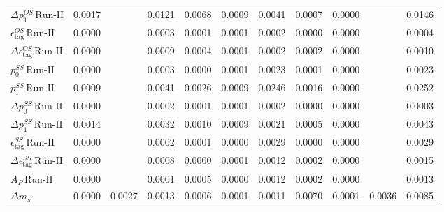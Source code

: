 \begin{tabular}{l  c  c  c  c  c  c  c  c  c  | c }
$\Delta p_{1}^{OS} \, \text{Run-II}$ & 0.0017 &  & 0.0121 & 0.0068 & 0.0009 & 0.0041 & 0.0007 & 0.0000 &  & 0.0146 \\ 
$\epsilon_{\text{tag}}^{OS} \, \text{Run-II}$ & 0.0000 &  & 0.0003 & 0.0001 & 0.0001 & 0.0002 & 0.0000 & 0.0000 &  & 0.0004 \\ 
$\Delta \epsilon_{\text{tag}}^{OS} \, \text{Run-II}$ & 0.0000 &  & 0.0009 & 0.0004 & 0.0001 & 0.0002 & 0.0002 & 0.0000 &  & 0.0010 \\ 
$p_{0}^{SS} \, \text{Run-II}$ & 0.0000 &  & 0.0003 & 0.0000 & 0.0001 & 0.0023 & 0.0001 & 0.0000 &  & 0.0023 \\ 
$p_{1}^{SS} \, \text{Run-II}$ & 0.0009 &  & 0.0041 & 0.0026 & 0.0009 & 0.0246 & 0.0016 & 0.0000 &  & 0.0252 \\ 
$\Delta p_{0}^{SS} \, \text{Run-II}$ & 0.0000 &  & 0.0002 & 0.0001 & 0.0001 & 0.0002 & 0.0000 & 0.0000 &  & 0.0003 \\ 
$\Delta p_{1}^{SS} \, \text{Run-II}$ & 0.0014 &  & 0.0032 & 0.0010 & 0.0009 & 0.0021 & 0.0005 & 0.0000 &  & 0.0043 \\ 
$\epsilon_{\text{tag}}^{SS} \, \text{Run-II}$ & 0.0000 &  & 0.0002 & 0.0001 & 0.0000 & 0.0029 & 0.0000 & 0.0000 &  & 0.0029 \\ 
$\Delta \epsilon_{\text{tag}}^{SS} \, \text{Run-II}$ & 0.0000 &  & 0.0008 & 0.0000 & 0.0001 & 0.0012 & 0.0002 & 0.0000 &  & 0.0015 \\ 
$A_{P} \, \text{Run-II}$ & 0.0000 &  & 0.0001 & 0.0005 & 0.0000 & 0.0012 & 0.0002 & 0.0000 &  & 0.0013 \\ 
$\Delta m_{s}$ & 0.0000 & 0.0027 & 0.0013 & 0.0006 & 0.0001 & 0.0011 & 0.0070 & 0.0001 & 0.0036 & 0.0085 \\ 
\hline
\hline
\end{tabular}
